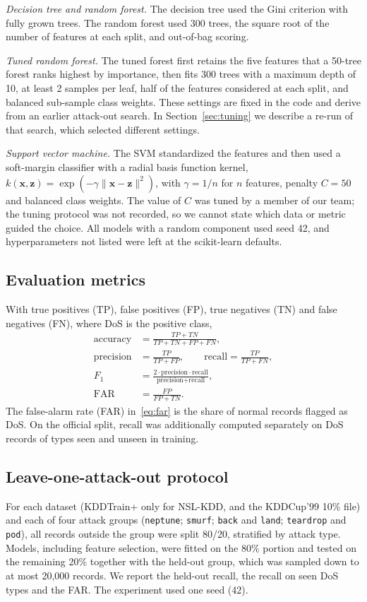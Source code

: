 \documentclass[conference]{IEEEtran}
\begin{document}
\emph{Decision tree and random forest.} The decision tree used the Gini criterion with fully grown trees. The random forest used 300 trees, the square root of the number of features at each split, and out-of-bag scoring.

\emph{Tuned random forest.} The tuned forest first retains the five features that a 50-tree forest ranks highest by importance, then fits 300 trees with a maximum depth of 10, at least 2 samples per leaf, half of the features considered at each split, and balanced sub-sample class weights. These settings are fixed in the code and derive from an earlier attack-out search. In Section~\ref{sec:tuning} we describe a re-run of that search, which selected different settings.

\emph{Support vector machine.} The SVM standardized the features and then used a soft-margin classifier with a radial basis function kernel, $k(\mathbf{x},\mathbf{z})=\exp(-\gamma\lVert\mathbf{x}-\mathbf{z}\rVert^2)$, with $\gamma=1/n$ for $n$ features, penalty $C=50$ and balanced class weights. The value of $C$ was tuned by a member of our team; the tuning protocol was not recorded, so we cannot state which data or metric guided the choice. All models with a random component used seed 42, and hyperparameters not listed were left at the scikit-learn defaults.

\subsection{Evaluation metrics}
With true positives (TP), false positives (FP), true negatives (TN) and false negatives (FN), where DoS is the positive class,
\begin{align}
  \text{accuracy} &= \frac{TP+TN}{TP+TN+FP+FN}, \label{eq:acc}\\
  \text{precision} &= \frac{TP}{TP+FP}, \qquad
  \text{recall} = \frac{TP}{TP+FN}, \label{eq:pr}\\
  F_1 &= \frac{2\cdot\text{precision}\cdot\text{recall}}{\text{precision}+\text{recall}}, \label{eq:f1}\\
  \text{FAR} &= \frac{FP}{FP+TN}. \label{eq:far}
\end{align}
The false-alarm rate (FAR) in~\eqref{eq:far} is the share of normal records flagged as DoS. On the official split, recall was additionally computed separately on DoS records of types seen and unseen in training.

\subsection{Leave-one-attack-out protocol}
For each dataset (KDDTrain+ only for NSL-KDD, and the KDDCup'99 10\% file) and each of four attack groups (\texttt{neptune}; \texttt{smurf}; \texttt{back} and \texttt{land}; \texttt{teardrop} and \texttt{pod}), all records outside the group were split 80/20, stratified by attack type. Models, including feature selection, were fitted on the 80\% portion and tested on the remaining 20\% together with the held-out group, which was sampled down to at most 20{,}000 records. We report the held-out recall, the recall on seen DoS types and the FAR. The experiment used one seed (42).
\end{document}
